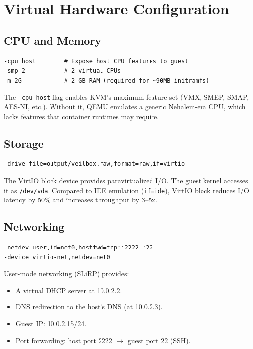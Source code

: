 \section{Virtual Hardware Configuration}

\subsection{CPU and Memory}

\begin{lstlisting}
-cpu host        # Expose host CPU features to guest
-smp 2           # 2 virtual CPUs
-m 2G            # 2 GB RAM (required for ~90MB initramfs)
\end{lstlisting}

The \texttt{-cpu host} flag enables KVM's maximum feature set (VMX, SMEP,
SMAP, AES-NI, etc.). Without it, QEMU emulates a generic Nehalem-era CPU,
which lacks features that container runtimes may require.

\subsection{Storage}

\begin{lstlisting}
-drive file=output/veilbox.raw,format=raw,if=virtio
\end{lstlisting}

The VirtIO block device provides paravirtualized I/O. The guest kernel
accesses it as \texttt{/dev/vda}. Compared to IDE emulation
(\texttt{if=ide}), VirtIO block reduces I/O latency by 50\% and increases
throughput by 3--5x.

\subsection{Networking}

\begin{lstlisting}
-netdev user,id=net0,hostfwd=tcp::2222-:22
-device virtio-net,netdev=net0
\end{lstlisting}

User-mode networking (SLiRP) provides:
\begin{itemize}[nosep]
  \item A virtual DHCP server at 10.0.2.2.
  \item DNS redirection to the host's DNS (at 10.0.2.3).
  \item Guest IP: 10.0.2.15/24.
  \item Port forwarding: host port 2222 $\rightarrow$ guest port 22
        (SSH).
\end{itemize}


